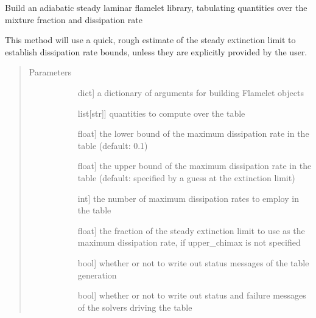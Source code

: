 \documentclass[letterpaper,10pt,english]{sphinxmanual}
\begin{document}
\begin{fulllineitems}
\label{\detokenize{spitfire.chemistry.flamelet:spitfire.chemistry.flamelet.build_adiabatic_slfm_table}}
Build an adiabatic steady laminar flamelet library, tabulating quantities over the mixture fraction and dissipation rate

This method will use a quick, rough estimate of the steady extinction limit to establish dissipation rate bounds,
unless they are explicitly provided by the user.
\begin{quote}\begin{description}
\item[{Parameters}] \leavevmode\begin{description}
\item[{}] \leavevmode{[}dict{]}
a dictionary of arguments for building Flamelet objects

\item[{}] \leavevmode{[}list{[}str{]}{]}
quantities to compute over the table

\item[{}] \leavevmode{[}float{]}
the lower bound of the maximum dissipation rate in the table (default: 0.1)

\item[{}] \leavevmode{[}float{]}
the upper bound of the maximum dissipation rate in the table (default: specified by a guess at the extinction limit)

\item[{}] \leavevmode{[}int{]}
the number of maximum dissipation rates to employ in the table

\item[{}] \leavevmode{[}float{]}
the fraction of the steady extinction limit to use as the maximum dissipation rate, if upper\_chimax is not specified

\item[{}] \leavevmode{[}bool{]}
whether or not to write out status messages of the table generation

\item[{}] \leavevmode{[}bool{]}
whether or not to write out status and failure messages of the solvers driving the table

\end{description}

\end{description}\end{quote}

\end{fulllineitems}
\end{document}
